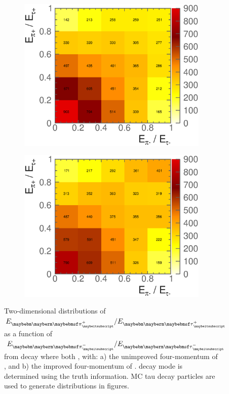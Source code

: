 \begin{figure}[htbp]
\centering %
\begin{subfigure}[b]{0.45\textwidth}
  \includegraphics[width=\textwidth]{tau/NoTimeAnalysis/2DNOimproveKE}
  \caption{}
  \label{fig:TauMini2DNOimproveKE}
\end{subfigure}
\begin{subfigure}[b]{0.45\textwidth}
  \includegraphics[width=\textwidth]{tau/NoTimeAnalysis/2DimproveKE}
  \caption{}
  \label{fig:TauMini2DimproveKE}
\end{subfigure}
\caption
{Two-dimensional distributions of $E_{\Ppiplus}/E_{\APtauon}$ as a function of $E_{\Ppiminus}/E_{\Ptauon}$ from \ZToTauTau decay where both \tauToPionBoth, with: a)   the  unimproved four-momentum of   \ZForTauTau, and b) the   improved four-momentum of   \ZForTauTau.  \tauToPionBoth decay mode is determined using the truth information. MC tau decay particles are used to generate distributions in figures.}
\label{fig:TauMini2DimproveKEAll}
\end{figure}



